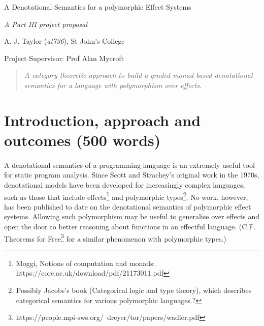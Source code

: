 \documentclass[11pt]{article}
\newcommand\comment[1]{}
\begin{document}
\centerline{\Large A Denotational Semantics for a polymorphic Effect Systems}
\vspace{2em}
\centerline{\Large \emph{A Part III project proposal}}
\vspace{2em}
\centerline{\large A. J. Taylor (\emph{at736}), St John's College}
\vspace{1em}
\centerline{\large Project Supervisor: Prof Alan Mycroft}
\vspace{1em}

\begin{abstract}
\textsl{
	A category theoretic approach to build a graded monad based denotational semantics for a language with polymorphism over effects.
} 
\end{abstract}

\section{Introduction, approach and outcomes (500 words)}

\comment{

(There is also some
earlier work on specific effects that you might want to cite instead
(e.g. look up idealized Algol).) I'm not sure what to cite for
polymorphism. 
 }
 
 \comment {
"May lead to better reasoning about functions": nobody actually knows if
this is the case yet, because nobody has given a semantics for effect
polymorphism that allows this reasoning to be done. You should make it
clear that showing this is the case is one of the contributions of the
project.
}

  
\paragraph{}{
A denotational semantics of a programming language is an extremely useful tool for static program analysis. Since Scott and Strachey's original work in the 1970s, denotational models have been developed for increasingly complex languages, such as those that include effects\footnote{Moggi, Notions of computation and monads: https://core.ac.uk/download/pdf/21173011.pdf} and polymorphic types\footnote{Possibly Jacobs's book (Categorical logic and type
theory), which describes categorical semantics for various polymorphic
languages.?}. No work, however, has been published to date on the denotational semantics of polymorphic effect systems. Allowing such polymorphism may be useful to generalise over effects and open the door to better reasoning about functions in an effectful language. (C.F. Theorems for Free\footnote{https://people.mpi-sws.org/~dreyer/tor/papers/wadler.pdf} for a similar phenomenon with polymorphic types.)
}
\end{document}
